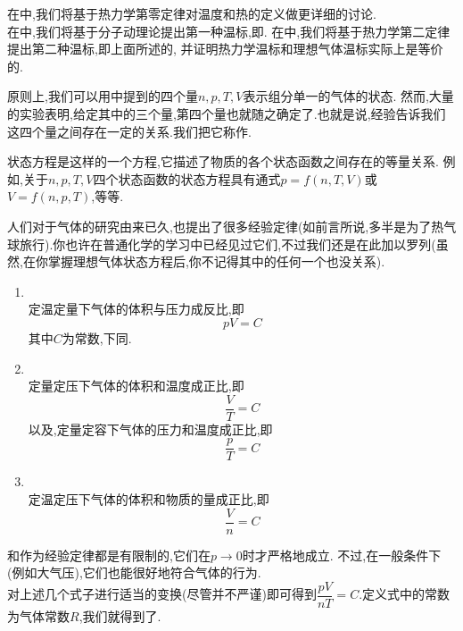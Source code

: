 \documentclass{ctexart}
\begin{document}
\begin{hint}
    在中,我们将基于热力学第零定律对温度和热的定义做更详细的讨论.\\
    在中,我们将基于分子动理论提出第一种温标,即.%
    在中,我们将基于热力学第二定律提出第二种温标,即上面所述的,%
    并证明热力学温标和理想气体温标实际上是等价的.
\end{hint}\vspace{8pt}
\indent 原则上,我们可以用中提到的四个量$n,p,T,V$表示组分单一的气体的状态.%
然而,大量的实验表明,给定其中的三个量,第四个量也就随之确定了.也就是说,经验告诉我们这四个量之间存在一定的关系.我们把它称作.
\begin{definition}[1A.2.1 状态方程]
    状态方程是这样的一个方程,它描述了物质的各个状态函数之间存在的等量关系.%
    例如,关于$n,p,T,V$四个状态函数的状态方程具有通式$p=f(n,T,V)$或$V=f(n,p,T)$,等等.
\end{definition}
人们对于气体的研究由来已久,也提出了很多经验定律(如前言所说,多半是为了热气球旅行).你也许在普通化学的学习中已经见过它们,不过我们还是在此加以罗列(虽然,在你掌握理想气体状态方程后,你不记得其中的任何一个也没关系).
\begin{theorem}[1A.2.2 描述气体的经验定律]
    \begin{enumerate}[label=\tbf{\arabic*.}]
        \item {}\\
            定温定量下气体的体积与压力成反比,即
            \[pV=C\]
            其中$C$为常数,下同.
        \item {}\\
            定量定压下气体的体积和温度成正比,即
            \[\dfrac VT=C\]
            以及,定量定容下气体的压力和温度成正比,即
            \[\dfrac pT=C\]
        \item {}\\
            定温定压下气体的体积和物质的量成正比,即
            \[\dfrac Vn=C\]

    \end{enumerate}
\end{theorem}
和作为经验定律都是有限制的,它们在$p\to0$时才严格地成立.%
不过,在一般条件下(例如大气压),它们也能很好地符合气体的行为.\\
\indent 对上述几个式子进行适当的变换(尽管并不严谨)即可得到$\dfrac{pV}{nT}=C$.定义式中的常数为气体常数$R$,我们就得到了.
\end{document}
